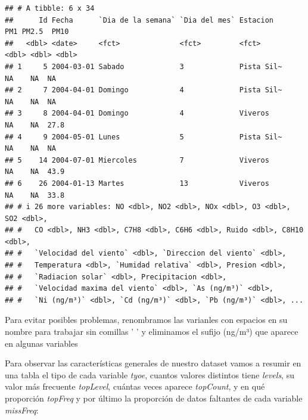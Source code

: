 \documentclass[notspecified,article,submit,moreauthors,pdftex]{Definitions/mdpi}
\newenvironment{Shaded}{\begin{snugshade}}{\end{snugshade}}
\newcommand{\AttributeTok}[1]{\textcolor[rgb]{0.13,0.29,0.53}{#1}}
\newcommand{\FunctionTok}[1]{\textcolor[rgb]{0.13,0.29,0.53}{\textbf{#1}}}
\newcommand{\NormalTok}[1]{#1}
\newcommand{\OtherTok}[1]{\textcolor[rgb]{0.56,0.35,0.01}{#1}}
\newcommand{\StringTok}[1]{\textcolor[rgb]{0.31,0.60,0.02}{#1}}
\begin{document}
\begin{verbatim}
## # A tibble: 6 x 34
##      Id Fecha      `Dia de la semana` `Dia del mes` Estacion     PM1 PM2.5  PM10
##   <dbl> <date>     <fct>              <fct>         <fct>      <dbl> <dbl> <dbl>
## 1     5 2004-03-01 Sabado             3             Pista Sil~    NA    NA  NA  
## 2     7 2004-04-01 Domingo            4             Pista Sil~    NA    NA  NA  
## 3     8 2004-04-01 Domingo            4             Viveros       NA    NA  27.8
## 4     9 2004-05-01 Lunes              5             Pista Sil~    NA    NA  NA  
## 5    14 2004-07-01 Miercoles          7             Viveros       NA    NA  43.9
## 6    26 2004-01-13 Martes             13            Viveros       NA    NA  33.8
## # i 26 more variables: NO <dbl>, NO2 <dbl>, NOx <dbl>, O3 <dbl>, SO2 <dbl>,
## #   CO <dbl>, NH3 <dbl>, C7H8 <dbl>, C6H6 <dbl>, Ruido <dbl>, C8H10 <dbl>,
## #   `Velocidad del viento` <dbl>, `Direccion del viento` <dbl>,
## #   Temperatura <dbl>, `Humidad relativa` <dbl>, Presion <dbl>,
## #   `Radiacion solar` <dbl>, Precipitacion <dbl>,
## #   `Velocidad maxima del viento` <dbl>, `As (ng/m³)` <dbl>,
## #   `Ni (ng/m³)` <dbl>, `Cd (ng/m³)` <dbl>, `Pb (ng/m³)` <dbl>, ...
\end{verbatim}

Para evitar posibles problemas, renombramos las varianles con espacios
en su nombre para trabajar sin comillas ' ' y eliminamos el sufijo
(ng/m³) que aparece en algunas variables

\begin{Shaded}
\end{Shaded}

Para observar las características generales de nuestro dataset vamos a
resumir en una tabla el tipo de cada variable \emph{tyoe}, cuantos
valores distintos tiene \emph{levels}, su valor más frecuente
\emph{topLevel}, cuántas veces aparece \emph{topCount}, y en qué
proporción \emph{topFreq} y por último la proporción de datos faltantes
de cada variable \emph{missFreq}:
\end{document}
